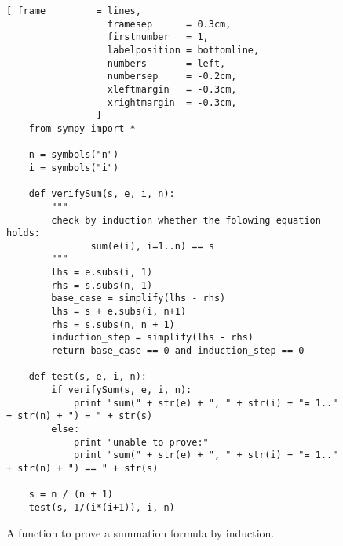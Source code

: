\documentclass{report}
\begin{document}
\begin{figure}[!ht]
\centering 
\begin{Verbatim}[ frame         = lines, 
                  framesep      = 0.3cm, 
                  firstnumber   = 1,
                  labelposition = bottomline,
                  numbers       = left,
                  numbersep     = -0.2cm,
                  xleftmargin   = -0.3cm,
                  xrightmargin  = -0.3cm,
                ]
    from sympy import * 
    
    n = symbols("n") 
    i = symbols("i") 
    
    def verifySum(s, e, i, n):
        """
        check by induction whether the folowing equation holds:
               sum(e(i), i=1..n) == s 
        """
        lhs = e.subs(i, 1) 
        rhs = s.subs(n, 1) 
        base_case = simplify(lhs - rhs) 
        lhs = s + e.subs(i, n+1) 
        rhs = s.subs(n, n + 1) 
        induction_step = simplify(lhs - rhs) 
        return base_case == 0 and induction_step == 0 
    
    def test(s, e, i, n):
        if verifySum(s, e, i, n):
            print "sum(" + str(e) + ", " + str(i) + "= 1.." + str(n) + ") = " + str(s) 
        else:
            print "unable to prove:"
            print "sum(" + str(e) + ", " + str(i) + "= 1.." + str(n) + ") == " + str(s) 
            
    s = n / (n + 1) 
    test(s, 1/(i*(i+1)), i, n) 
\end{Verbatim}
\vspace*{-0.3cm}
\caption{A function to prove a summation formula by induction.}
\label{fig:induction.py}
\end{figure}
\end{document}
